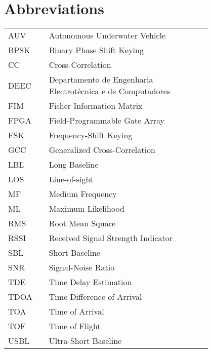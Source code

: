 \chapter*{Abbreviations}

\begin{flushleft}
\begin{tabular}{l p{0.8\linewidth}}
AUV 	  & Autonomous Underwater Vehicle \\
BPSK      & Binary Phase Shift Keying \\
CC 		  & Cross-Correlation \\
DEEC 	  & Departamento de Engenharia Electrotécnica e de Computadores \\
FIM		  & Fisher Information Matrix \\
FPGA 	  & Field-Programmable Gate Array \\
FSK		  & Frequency-Shift Keying \\
GCC       & Generalized Cross-Correlation \\
LBL		  & Long Baseline\\
LOS		  & Line-of-sight\\
MF		  & Medium Frequency \\
ML		  & Maximum Likelihood \\
RMS		  & Root Mean Square \\
RSSI 	  & Received Signal Strength Indicator \\
SBL		  & Short Baseline \\
SNR		  & Signal-Noise Ratio\\
TDE 	  & Time Delay Estimation \\
TDOA	  & Time Difference of Arrival \\
TOA		  & Time of Arrival \\
TOF		  & Time of Flight \\
USBL      & Ultra-Short Baseline
\end{tabular}
\end{flushleft}